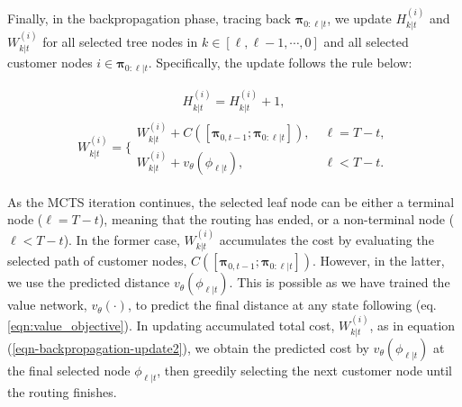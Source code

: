 \documentclass{article}
\begin{document}
Finally, in the backpropagation phase, tracing back $\boldsymbol{\pi}_{0:\ell | t}$, we update $H^{(i)}_{k|t}$ and $W^{(i)}_{k|t}$ for all selected tree nodes in $k \in [\ell, \ell-1, \cdots, 0]$ and
all selected customer nodes $i \in \boldsymbol{\pi}_{0:\ell|t}$. Specifically, the update follows the rule below:

\begin{align}\label{eqn-backpropagation-update1}
    H^{(i)}_{k|t} = H^{(i)}_{k|t} + 1,
\end{align}
\begin{align}\label{eqn-backpropagation-update2}
    W^{(i)}_{k|t} = \{
    \begin{array}{ll}
         W^{(i)}_{k|t} + C([\boldsymbol{\pi}_{0,t-1}; \boldsymbol{\pi}_{0:\ell | t}]), &  \; \ell = T-t,\\
         W^{(i)}_{k|t} + v_\theta(\phi_{\ell|t}), &  \; \ell < T-t.
    \end{array}
\end{align}

As the MCTS iteration continues, the selected leaf node can be either a terminal node ($\ell=T-t$), meaning that the routing has ended, or a non-terminal node ($\ell < T-t$). In the former case, $W^{(i)}_{k|t}$ accumulates the cost by evaluating the selected path of customer nodes, $C([\boldsymbol{\pi}_{0,t-1}; \boldsymbol{\pi}_{0:\ell | t}])$. However, in the latter, we use the predicted distance $v_\theta(\phi_{\ell|t})$. This is possible as we have trained the value network, $v_\theta(\cdot)$, to predict the final distance at any state following (eq. \ref{eqn:value_objective}).
In updating accumulated total cost, $W_{k|t}^{(i)}$, as in equation (\ref{eqn-backpropagation-update2}), we obtain the predicted cost by $v_\theta(\phi_{\ell|t})$ at the final selected node $\phi_{\ell|t}$, then greedily selecting the next customer node until the routing finishes. %
\end{document}
